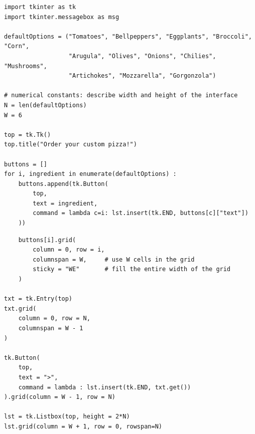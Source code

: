 \begin{frame}[fragile]
%
\begin{codebox}
\begin{verbatim}
import tkinter as tk
import tkinter.messagebox as msg

defaultOptions = ("Tomatoes", "Bellpeppers", "Eggplants", "Broccoli", "Corn",
                  "Arugula", "Olives", "Onions", "Chilies", "Mushrooms",
                  "Artichokes", "Mozzarella", "Gorgonzola")

# numerical constants: describe width and height of the interface
N = len(defaultOptions)
W = 6

top = tk.Tk()
top.title("Order your custom pizza!")

buttons = []
for i, ingredient in enumerate(defaultOptions) :
    buttons.append(tk.Button(
        top,
        text = ingredient,
        command = lambda c=i: lst.insert(tk.END, buttons[c]["text"])
    ))
\end{verbatim}
\end{codebox}
%
\end{frame}


\begin{frame}[fragile]
%
\begin{codebox}
\begin{verbatim}
    buttons[i].grid(
        column = 0, row = i,
        columnspan = W,     # use W cells in the grid
        sticky = "WE"       # fill the entire width of the grid
    )

txt = tk.Entry(top)
txt.grid(
    column = 0, row = N,
    columnspan = W - 1
)

tk.Button(
    top,
    text = ">",
    command = lambda : lst.insert(tk.END, txt.get())
).grid(column = W - 1, row = N)

lst = tk.Listbox(top, height = 2*N)
lst.grid(column = W + 1, row = 0, rowspan=N)
\end{verbatim}
\end{codebox}
%
\end{frame}


